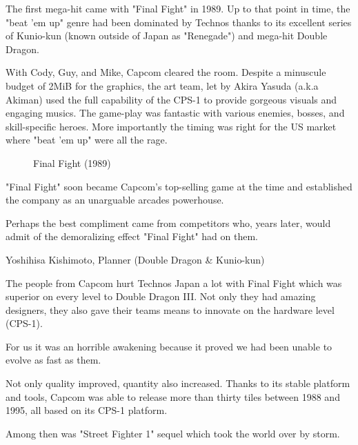 The first mega-hit came with "Final Fight" in 1989. Up to that point in time, the "beat 'em up" genre had been dominated by Technos thanks to its excellent series of Kunio-kun (known outside of Japan as "Renegade") and mega-hit Double Dragon. 

With Cody, Guy, and Mike, Capcom cleared the room. Despite a minuscule budget of 2MiB for the graphics, the art team, let by Akira Yasuda (a.k.a Akiman) used the full capability of the CPS-1 to provide gorgeous visuals and engaging musics. The game-play was fantastic with various enemies, bosses, and skill-specific heroes. More importantly the timing was right for the US market where "beat 'em up" were all the rage.



  

\label{nin_ff}
 \begin{figure}[H]
\caption*{Final Fight (1989)}
\end{figure}

"Final Fight" soon became Capcom's top-selling game at the time\cite{birth_of_chunli} and established the company as an unarguable arcades powerhouse.

\pagebreak

Perhaps the best compliment came from competitors who, years later, would admit of the demoralizing effect "Final Fight" had on them.

\begin{q}{Yoshihisa Kishimoto, Planner (Double Dragon \& Kunio-kun)\cite{dd} }
  

  The people from Capcom hurt Technos Japan a lot with Final Fight which was superior on every level to Double Dragon III. Not only they had amazing designers, they also gave their teams means to innovate on the hardware level (CPS-1). 

  For us it was an horrible awakening because it proved we had been unable to evolve as fast as them.
  \end{q}



Not only quality improved, quantity also increased. Thanks to its stable platform and tools, Capcom was able to release more than thirty tiles between 1988 and 1995, all based on its CPS-1 platform. 

Among then was "Street Fighter 1" sequel which took the world over by storm.

